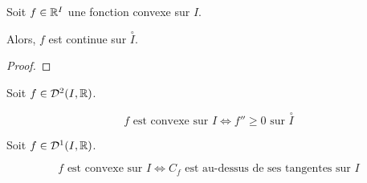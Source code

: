 \documentclass[12pt, a4paper]{report}
\begin{document}
\begin{consequence}
  Soit $f \in \mathbb{R}^I$ une fonction convexe sur $I$.

  Alors, $f$ est continue sur $\overset{\circ}{I}$.
\end{consequence}

\begin{proof}
  
\end{proof}

\begin{consequence}
  Soit $f \in \mathcal{D}^2(I,\mathbb{R})$.

  $$f \text{ est convexe sur } I \iff f'' \ge 0 \text{ sur } \overset{\circ}{I}$$
\end{consequence}

\begin{property}
  Soit $f \in \mathcal{D}^1(I,\mathbb{R})$.

  $$f \text{ est convexe sur } I \iff C_f \text{ est au-dessus de ses tangentes sur } I$$
\end{property}
\end{document}
